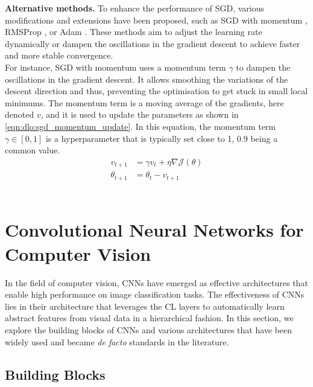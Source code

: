 \noindent \textbf{Alternative methods.} To enhance the performance of \ac{SGD},
various modifications and extensions have been proposed, such as \ac{SGD} with
momentum \cite{sutskever2013importance}, RMSProp \cite{hinton2012neural}, or
Adam \cite{kingma2014adam}. These methods aim to adjust the learning rate
dynamically or dampen the oscillations in the gradient descent to achieve faster
and more stable convergence.\\

For instance, \ac{SGD} with momentum \cite{sutskever2013importance} uses a
momentum term $\gamma$ to dampen the oscillations in the gradient descent. It
allows smoothing the variations of the descent direction and thus, preventing
the optimisation to get stuck in small local minimums. The momentum term is a
moving average of the gradients, here denoted $v$, and it is used to update the
parameters as shown in \cref{eqn:dlo:sgd_momentum_update}. In this equation, the
momentum term $\gamma \in [0,1]$ is a hyperparameter that is typically set close
to 1, $0.9$ being a common value.\\

\begin{equation}
  \label{eqn:dlo:sgd_momentum_update}
  \begin{split}
    v_{t+1} &= \gamma v_t + \eta \nabla \mathcal{J}(\theta) \\
    \theta_{t+1} &= \theta_t - v_{t+1}
  \end{split}
\end{equation}\\

\section{Convolutional Neural Networks for Computer Vision}\label{sec:dlo:cnn}

In the field of computer vision, \acp{CNN} have emerged as effective
architectures that enable high performance on image classification tasks. The
effectiveness of \acp{CNN} lies in their architecture that leverages the \ac{CL}
layers to automatically learn abstract features from visual data in a
hierarchical fashion. In this section, we explore the building blocks of
\acp{CNN} and various architectures that have been widely used and became
\emph{de facto} standards in the literature.

\subsection{Building Blocks}

